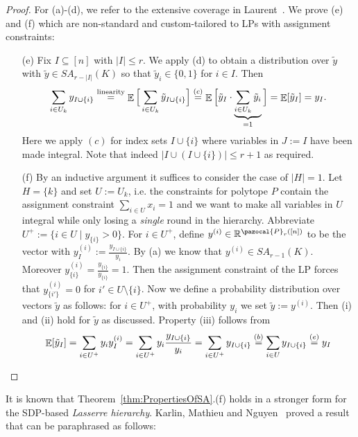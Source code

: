 \begin{proof}
  For (a)-(d), we refer to the extensive coverage in Laurent~\cite{Comparison-of-Hierarchies-Laurent-MOR03}. We prove (e) and (f) which are non-standard and custom-tailored to LPs with assignment constraints: 
  \begin{enumerate}
  \item [(e)] Fix $I \subseteq [n]$ with $|I| \leq r$. We apply (d) to obtain a distribution over $\tilde{y}$ with $\tilde{y} \in SA_{r-|I|}(K)$ so that $\tilde{y}_i \in \{ 0,1\}$ for $i \in I$. Then
    \[
\sum_{i \in U_k} y_{I \cup \{ i\}}\stackrel{\textrm{linearity}}{=} \mathop{\mathbb{E}}\Big[ \sum_{i \in U_k} \tilde{y}_{I \cup \{ i\}}\Big] \stackrel{(c)}{=} \mathop{\mathbb{E}}\Big[ \tilde{y}_I \cdot \underbrace{\sum_{i \in U_k} \tilde{y}_i}_{=1}\Big] = \mathop{\mathbb{E}}[\tilde{y}_I] = y_I.
    \]
Here we apply $(c)$ for index sets $I \cup \{ i\}$ where variables in $J := I$ have been made integral. Note that indeed $|I \cup (I \cup \{ i\})| \leq r+1$ as required. 
\item[(f)] By an inductive argument it suffices to consider the case of $|H| = 1$.
  Let $H = \{ k\}$ and set $U := U_k$, i.e. the constraints for polytope $P$ contain the assignment constraint $\sum_{i \in U} x_i = 1$ and we want to make all variables
  in $U$ integral while only losing a \emph{single} round in the hierarchy. Abbreviate $U^+ := \{ i \in U \mid y_{\{i\}} > 0\}$.
  For $i \in U^+$, define $y^{(i)} \in \setR^{\pazocal{P}_{r}([n])}$
  to be the vector with $y^{(i)}_I := \frac{y_{I \cup \{ i\}}}{y_i}$. By (a) we know that $y^{(i)} \in SA_{r-1}(K)$. Moreover $y^{(i)}_{\{i\}} = \frac{y_{\{i\}}}{y_{\{i\}}} = 1$. Then the assignment constraint of the LP forces that $y_{\{i'\}}^{(i)} = 0$ for $i' \in U \setminus \{ i\}$. Now we define a probability distribution over vectors
  $\tilde{y}$ as follows: for $i \in U^+$, with probability $y_i$ we set $\tilde{y} := y^{(i)}$. Then (i) and (ii) hold for $\tilde{y}$  as discussed.
  Property (iii) follows from
  \[
\mathop{\mathbb{E}}[\tilde{y}_I] = \sum_{i \in U^+} y_i y_I^{(i)} = \sum_{i \in U^+} y_i \frac{y_{I \cup \{i\}}}{y_i} = \sum_{i \in U^+} y_{I \cup \{i\}} \stackrel{(b)}{=} \sum_{i \in U} y_{I \cup \{ i\}} \stackrel{(e)}{=} y_I
  \]
 \end{enumerate} 
\end{proof}
It is known that Theorem~\ref{thm:PropertiesOfSA}.(f) holds in a stronger form for the SDP-based \emph{Lasserre hierarchy}.
 Karlin, Mathieu and Nguyen~\cite{Hierarchies-for-Knapsack-KarlinMathieuNguyen-IPCO11} proved a result that can be paraphrased as follows:
